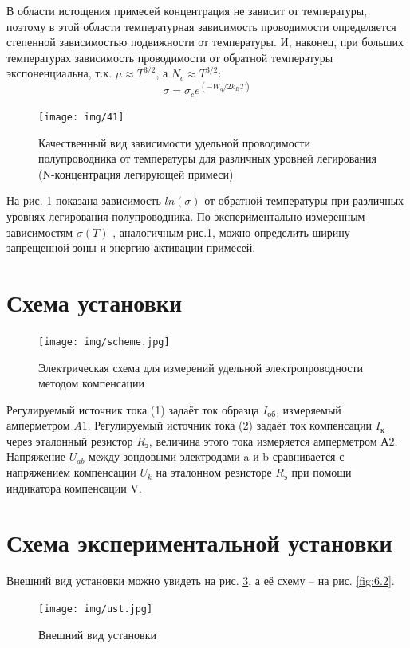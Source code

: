 \documentclass[a4paper,14pt]{extarticle}
\begin{document}
В области истощения примесей концентрация не зависит от температуры, поэтому в этой области температурная зависимость проводимости определяется
степенной зависимостью подвижности от температуры. И, наконец, при больших температурах зависимость проводимости от
обратной температуры экспоненциальна, т.к. $\mu \approx T^{3/2}$, а  $N_c \approx T^{3/2}$:
 \begin{equation}
	\sigma=\sigma_{c} e^{\left(-W_{g} / 2 k_{B} T\right)}
	 \label{eq:4.4}
 \end{equation}
 \begin{figure}[h!]
	\centering
	\texttt{[image: img/41]}
	\caption{Качественный вид зависимости удельной проводимости полупроводника от температуры для различных уровней легирования (N-концентрация легирующей примеси)}
	\label{fig:4.1}
\end{figure}
 
 На рис. \ref{fig:4.1} показана зависимость $ln(\sigma)$ от обратной температуры при различных уровнях легирования полупроводника. По
 экспериментально измеренным зависимостям $\sigma(T)$ , аналогичным рис.\ref{fig:4.1}, можно определить ширину запрещенной зоны и
 энергию активации примесей. 

\section{Схема установки}

\begin{figure}[h!]
	\centering
	\texttt{[image: img/scheme.jpg]}
	\caption{Электрическая схема для измерений удельной электропроводности методом компенсации}
	\label{fig:5.1}
\end{figure}

Регулируемый источник тока (1) задаёт ток образца $I_\text{об}$, измеряемый амперметром $A1$. Регулируемый источник тока
(2) задаёт ток компенсации $I_\text{к}$ через эталонный резистор $R_\text{э}$, величина этого тока измеряется
амперметром $А2$. Напряжение $U_{ab}$ между зондовыми электродами a и b сравнивается с напряжением компенсации $U_k$ на
эталонном резисторе $R_\text{э}$ при помощи индикатора компенсации V.


\section{Схема экспериментальной установки}
Внешний вид установки можно увидеть на рис. \ref{fig:6.1}, а её схему – на рис. \ref{fig:6.2}. 

\begin{figure}[h!]
	\centering
	\texttt{[image: img/ust.jpg]}
	\caption{Внешний вид установки}
	\label{fig:6.1}
\end{figure}
\end{document}
